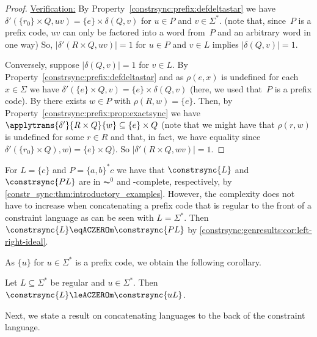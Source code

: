 \begin{proof}
	\medskip 
	\noindent\underline{Verification:} 
	By Property~\ref{constrsync:prefix:defdeltastar}
	we have $\delta'(\{r_0\} \times Q, uv) = \{e\} \times \delta(Q, v)$
	for $u \in P$ and $v \in \Sigma^*$. (note that, since~$P$ is a 
	prefix code, $uv$ can only be factored into a word from~$P$
	and an arbitrary word in one way)
	So, $|\delta'(R \times Q, uv)| = 1$
	for $u \in P$ and $v \in L$
	implies $|\delta(Q, v)| = 1$.	
	
	Conversely, suppose $|\delta(Q, v)| = 1$
	for $v \in L$. 
	By Property~\ref{constrsync:prefix:defdeltastar} and as $\rho(e,x)$ is undefined for each $x \in \Sigma$
	we have $\delta'(\{e\} \times Q, v) = \{e\} \times \delta(Q, v)$ (here, we used that~$P$ is a prefix code).
	By  
	there exists $w \in P$ with
	$\rho(R, w) = \{e\}$.
	Then, by Property~\ref{constrsync:prefix:prop:exactsync} 
	we have $\applytrans{\delta'}{R \times Q}{w} \subseteq \{e\} \times Q$ (note that
	we might have that $\rho(r, w)$ is undefined for some $r \in R$ 
	and that, in fact, we have equality since $\delta'(\{r_0\}\times Q), w) = \{e\} \times Q$).
	So $|\delta'(R \times Q, wv)| = 1$.
\end{proof} 

\begin{remark}
	For $L = \{c\}$ and $P = \{a,b\}^*c$
	we have that $\constrsync{L}$ 
	and $\constrsync{PL}$
	are in $\AC^0$
	and \PSPACE-complete, respectively,
	by \cref{constr_sync:thm:introductory_examples}.
	However, the complexity does not have to increase when concatenating
	a prefix code that is regular to the front of a constraint
	language as can be seen with $L = \Sigma^*$.
	Then $\constrsync{L} \eqACZEROm \constrsync{PL}$
	by \cref{constrsync:genresults:cor:left-right-ideal}.		
\end{remark}

As $\{u\}$ for $u \in \Sigma^*$ is a prefix code, we obtain the following corollary.

\begin{corollary}
	Let $L \subseteq \Sigma^*$ be regular and $u \in \Sigma^*$.
	Then $\constrsync{L} \leACZEROm \constrsync{uL}$.
\end{corollary}


Next, we state a result on concatenating
languages to the back of the constraint language.


